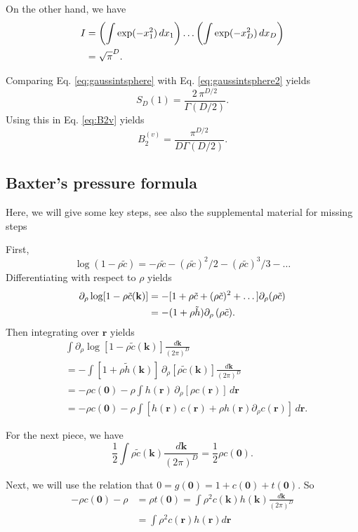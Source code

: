\documentclass[aip,jcp,reprint,superscriptaddress]{revtex4-1}
\numberwithin{equation}{subsection}
\newcommand{\vct}[1]{\mathbf{#1}}
\providecommand{\vr}{} %
\renewcommand{\vr}{\vct{r}}
\newcommand{\vk}{\vct{k}}
\newcommand{\dvk}{\frac{d\vk}{(2\pi)^D}}
\begin{document}
On the other hand, we have
\begin{align}
  I
  &=
\left( \int \exp(-x_1^2) \, d x_1 \right)
\dots
\left( \int \exp(-x_D^2) \, d x_D \right) \notag \\
&= \sqrt\pi^D.
\label{eq:gaussintsphere2}
\end{align}

Comparing Eq. \eqref{eq:gaussintsphere} with Eq. \eqref{eq:gaussintsphere2}
yields
\begin{equation}
  S_D(1) = \frac{ 2 \, \pi^{D/2} } { \Gamma(D/2) }.
  \label{eq:surfareaD}
\end{equation}
Using this in Eq. \eqref{eq:B2v} yields
\[
  B_2^{(v)} = \frac{ \pi^{D/2} } { D \Gamma(D/2) }.
\]



\subsection{Baxter's pressure formula}

Here, we will give some key steps, see also the supplemental material
for missing steps

First,
\[
\log(1 - \rho \tilde{c})
=
-\rho \tilde{c}
-(\rho \tilde{c})^2/2
-(\rho \tilde{c})^3/3
-\dots
\]
Differentiating with respect to $\rho$ yields
\begin{align*}
\partial_\rho \log[1 - \rho \tilde{c}(\vk)]
&=
-[1
  + \rho \tilde{c}
  + (\rho \tilde{c})^2
  + \dots
  ] \partial_\rho (\rho \tilde c)
  \notag \\
&=
-(1 + \rho \tilde h) \partial_\rho \, (\rho \tilde c).
\end{align*}
%
Then integrating over $\vr$ yields
\begin{align*}
  & \int \partial_\rho \log[1 - \rho \tilde{c}(\vk)] \dvk \\
  &= -\int [1 + \rho \tilde{h}(\vk)] \, \partial_\rho [\rho \tilde{c}(\vk)] \dvk \\
  &= -\rho c(\vct 0)
  - \rho \int h(\vr) \, \partial_\rho [\rho c(\vr)] \, d\vr \\
  &= -\rho c(\vct 0)
  - \rho \int
  [h(\vr) \, c(\vr) + \rho h(\vr) \partial_\rho c(\vr)] \, d\vr.
\end{align*}
%


For the next piece, we have
\[
  \frac{1}{2} \int \rho \tilde{c}(\vk) \dvk = \frac{1}{2} \rho c(\vct{0}).
\]

Next, we will use the relation that
$0 = g(\vct0) = 1 + c(\vct0) + t(\vct0)$.
So
\begin{align*}
   -\rho c(\vct{0}) - \rho
  &= \rho t(\vct{0})
  = \int \rho^2 c(\vk) h(\vk) \dvk \\
  &= \int \rho^2 c(\vr) h(\vr) d\vr
\end{align*}
\end{document}
